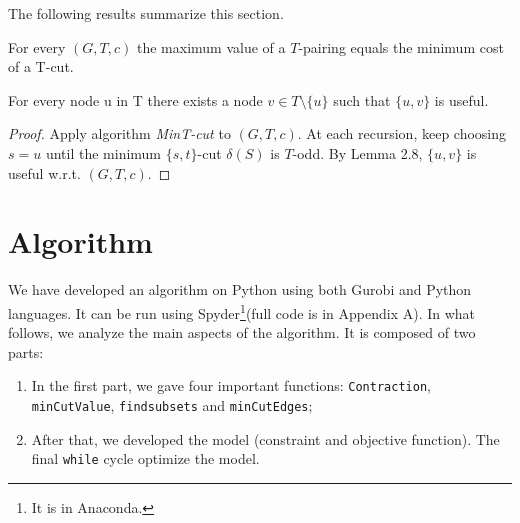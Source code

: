 The following results summarize this section. 

\begin{theorem}
For every $(G,T,c)$ the maximum value of a $T$-pairing equals the minimum cost of a T-cut.
\end{theorem}

\begin{theorem}
For every node u in T there exists a node $v \in T \setminus \{u\}$ such that $\{u,v\}$ is useful.
\end{theorem}

\begin{proof}
Apply algorithm \emph{MinT-cut} to $(G,T,c)$. At each recursion, keep choosing $s = u$ until the minimum $\{s,t\}$-cut $\delta(S)$ is $T$-odd. By Lemma 2.8, $\{u,v\}$ is useful w.r.t. $(G,T,c)$.
\end{proof}

\section{Algorithm}
We have developed an algorithm on Python using both Gurobi and Python languages. It can be run using Spyder\footnote{It is in Anaconda.}(full code is in Appendix A). In what follows, we analyze the main aspects of the algorithm. It is composed of two parts: 
\begin{enumerate}
\item In the first part, we gave four important functions: \texttt{Contraction}, \texttt{minCutValue}, \texttt{findsubsets} and \texttt{minCutEdges};\\
\item After that,  we developed the model (constraint and objective function). The final \texttt{while} cycle optimize the model. 
\end{enumerate}

